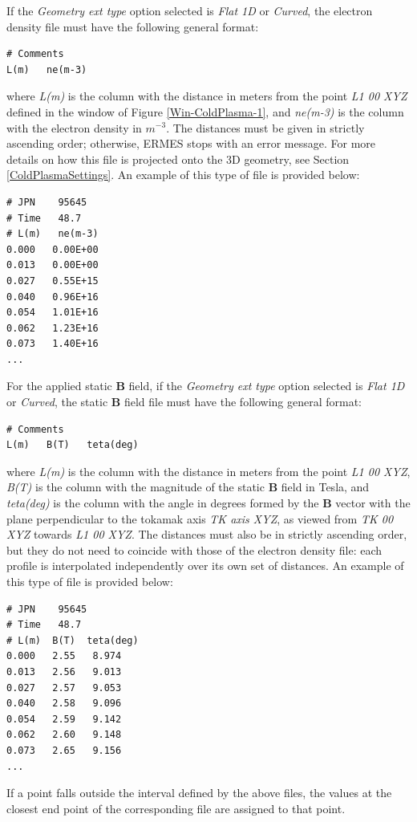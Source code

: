 If the \emph{Geometry ext type} option selected is \textit{Flat 1D} or \textit{Curved}, the electron density file must have the following general format:
\begin{small}\begin{lstlisting}
# Comments	 
L(m)   ne(m-3)	
\end{lstlisting}\end{small} 
where \textit{L(m)} is the column with the distance in meters from the point \textit{L1 00 XYZ} defined in the window of Figure \ref{Win-ColdPlasma-1}, and \textit{ne(m-3)} is the column with the electron density in $m^{-3}$. The distances must be given in strictly ascending order; otherwise, ERMES stops with an error message. For more details on how this file is projected onto the 3D geometry, see Section \ref{ColdPlasmaSettings}. An example of this type of file is provided below:
\begin{small}\begin{lstlisting}
# JPN    95645	 
# Time   48.7	
# L(m)	 ne(m-3)	
0.000   0.00E+00
0.013   0.00E+00
0.027   0.55E+15
0.040   0.96E+16
0.054   1.01E+16
0.062   1.23E+16
0.073   1.40E+16
...
\end{lstlisting}\end{small} 
For the applied static \textbf{B} field, if the \emph{Geometry ext type} option selected is \textit{Flat 1D} or \textit{Curved}, the static \textbf{B} field file must have the following general format:
\begin{small}\begin{lstlisting}
# Comments	 
L(m)   B(T)   teta(deg)
\end{lstlisting}\end{small} 
where \textit{L(m)} is the column with the distance in meters from the point \textit{L1 00 XYZ}, \textit{B(T)} is the column with the magnitude of the static \textbf{B} field in Tesla, and \textit{teta(deg)} is the column with the angle in degrees formed by the \textbf{B} vector with the plane perpendicular to the tokamak axis \textit{TK axis XYZ}, as viewed from \textit{TK 00 XYZ} towards \textit{L1 00 XYZ}. The distances must also be in strictly ascending order, but they do not need to coincide with those of the electron density file: each profile is interpolated independently over its own set of distances. An example of this type of file is provided below:
\begin{small}\begin{lstlisting}
# JPN    95645	 
# Time   48.7	
# L(m)  B(T)  teta(deg)
0.000   2.55   8.974
0.013   2.56   9.013
0.027   2.57   9.053
0.040   2.58   9.096
0.054   2.59   9.142
0.062   2.60   9.148
0.073   2.65   9.156
...
\end{lstlisting}\end{small} 
If a point falls outside the interval defined by the above files, the values at the closest end point of the corresponding file are assigned to that point.

